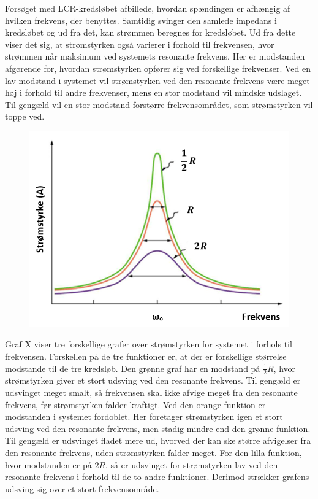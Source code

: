 Forsøget med LCR-kredsløbet afbillede, hvordan spændingen er afhængig af hvilken frekvens, der benyttes. Samtidig svinger den samlede impedans i kredsløbet og ud fra det, kan strømmen beregnes for kredsløbet. Ud fra dette viser det sig, at strømstyrken også varierer i forhold til frekvensen, hvor strømmen når maksimum ved systemets resonante frekvens. Her er modstanden afgørende for, hvordan strømstyrken opfører sig ved forskellige frekvenser. Ved en lav modstand i systemet vil strømstyrken ved den resonante frekvens være meget høj i forhold til andre frekvenser, mens en stor modstand vil mindske udslaget. Til gengæld vil en stor modstand forstørre frekvensområdet, som strømstyrken vil toppe ved.

\begin{figure}[H]
\includegraphics[scale=0.5]{Vildledning/Schematics/Resonanskurver}
\end{figure}

Graf X viser tre forskellige grafer over strømstyrken for systemet i forhols til frekvensen. Forskellen på de tre funktioner er, at der er forskellige størrelse modstande til de tre kredsløb. Den grønne graf har en modstand på $\frac{1}{2} R$, hvor strømstyrken giver et stort udsving ved den resonante frekvens. Til gengæld er udsvinget meget smalt, så frekvensen skal ikke afvige meget fra den resonante frekvens, før strømstyrken falder kraftigt. Ved den orange funktion er modstanden i systemet fordoblet. Her foretager strømstyrken igen et stort udsving ved den resonante frekvens, men stadig mindre end den grønne funktion. Til gengæld er udsvinget fladet mere ud, hvorved der kan ske større afvigelser fra den resonante frekvens, uden strømstyrken falder meget. For den lilla funktion, hvor modstanden er på $2 R$, så er udsvinget for strømstyrken lav ved den resonante frekvens i forhold til de to andre funktioner. Derimod strækker grafens udsving sig over et stort frekvensområde.

